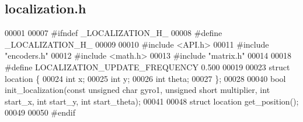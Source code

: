 \subsection{localization.\+h}
\label{localization_8h_source}

\begin{DoxyCode}
00001 
00007 \textcolor{preprocessor}{#ifndef \_LOCALIZATION\_H\_}
00008 \textcolor{preprocessor}{#define \_LOCALIZATION\_H\_}
00009 
00010 \textcolor{preprocessor}{#include <API.h>}
00011 \textcolor{preprocessor}{#include "encoders.h"}
00012 \textcolor{preprocessor}{#include <math.h>}
00013 \textcolor{preprocessor}{#include "matrix.h"}
00014 
00018 \textcolor{preprocessor}{#define LOCALIZATION\_UPDATE\_FREQUENCY 0.500}
00019 
00023 \textcolor{keyword}{struct }location \{
00024   \textcolor{keywordtype}{int} x;
00025   \textcolor{keywordtype}{int} y;
00026   \textcolor{keywordtype}{int} theta;
00027 \};
00028 
00040 \textcolor{keywordtype}{bool} init_localization(\textcolor{keyword}{const} \textcolor{keywordtype}{unsigned} \textcolor{keywordtype}{char} gyro1, \textcolor{keywordtype}{unsigned} \textcolor{keywordtype}{short} multiplier, \textcolor{keywordtype}{int} start\_x, \textcolor{keywordtype}{int} start\_y, \textcolor{keywordtype}{int} 
      start\_theta);
00041 
00048 \textcolor{keyword}{struct }location get_position();
00049 
00050 \textcolor{preprocessor}{#endif}
\end{DoxyCode}
